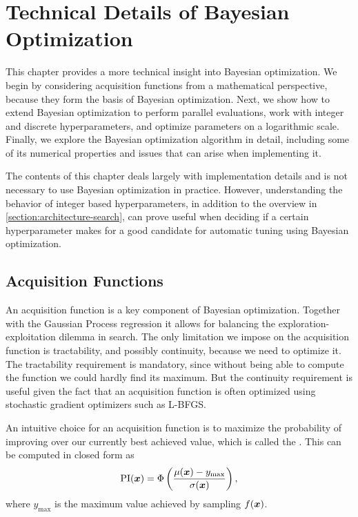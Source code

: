 \chapter{Technical Details of Bayesian Optimization}
\label{chapter:bo-indepth}

This chapter provides a more technical insight into Bayesian optimization. We begin by considering acquisition functions from a mathematical perspective, because they form the basis of Bayesian optimization. Next, we show how to extend Bayesian optimization to perform parallel evaluations, work with integer and discrete hyperparameters, and optimize parameters on a logarithmic scale. Finally, we explore the Bayesian optimization algorithm in detail, including some of its numerical properties and issues that can arise when implementing it.

The contents of this chapter deals largely with implementation details and is not necessary to use Bayesian optimization in practice. However, understanding the behavior of integer based hyperparameters, in addition to the overview in \autoref{section:architecture-search}, can prove useful when deciding if a certain hyperparameter makes for a good candidate for automatic tuning using Bayesian optimization.

\section{Acquisition Functions}
\label{section:acq-fn}

An acquisition function is a key component of Bayesian optimization. Together with the Gaussian Process regression it allows for balancing the exploration-exploitation dilemma in search. The only limitation we impose on the acquisition function is tractability, and possibly continuity, because we need to optimize it. The tractability requirement is mandatory, since without being able to compute the function we could hardly find its maximum. But the continuity requirement is useful given the fact that an acquisition function is often optimized using stochastic gradient optimizers such as L-BFGS.

An intuitive choice for an acquisition function is to maximize the probability
of improving over our currently best achieved value, which is called the
. This can be computed in closed form as
$$
\operatorname{PI}({\boldsymbol{x}}) = \Phi \left( \frac{\mu({\boldsymbol{x}}) - y_{\max}}{\sigma({\boldsymbol{x}})} \right),
$$
where $y_{\max}$ is the maximum value achieved by sampling $f({\boldsymbol{x}})$.

